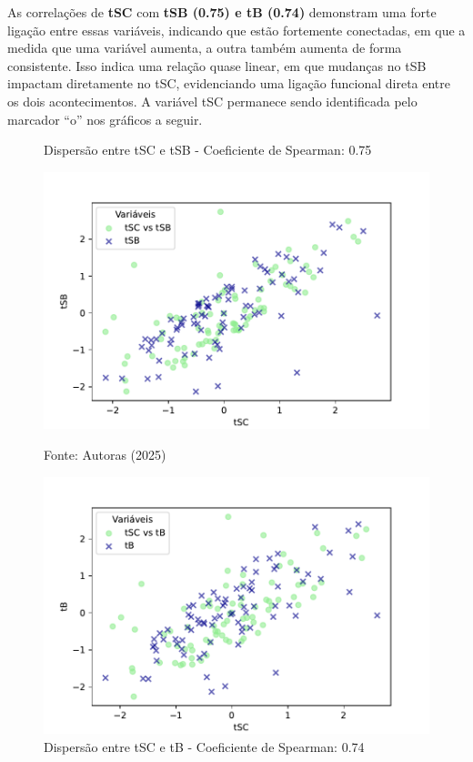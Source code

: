 As correlações de \textbf{tSC} com \textbf{tSB (0.75) e tB (0.74)} demonstram uma forte ligação entre essas variáveis, indicando que estão fortemente conectadas, em que a medida que uma variável aumenta, a outra também aumenta de forma consistente. Isso indica uma relação quase linear, em que mudanças no tSB impactam diretamente no tSC, evidenciando uma ligação funcional direta entre os dois acontecimentos. A variável tSC permanece sendo identificada pelo marcador “o” nos gráficos a seguir.

\begin{figure}[h]
    \captionsetup{font=footnotesize, justification=centering, labelsep=period, position=above}
    \centering
    \begin{minipage}[b]{0.45\linewidth}
        \caption{Dispersão entre tSC e tSB - Coeficiente de Spearman: 0.75}
        \label{fig:tSC-tSB}
        \centering
        \includegraphics[scale=0.35]{figuras/Spearman/tSC-tSB.pdf}
        \vspace{0.3cm}
        \begin{minipage}{\linewidth}
            \centering
            \scriptsize{Fonte: Autoras (2025)}
        \end{minipage}
    \end{minipage}
    \hspace{0.05\linewidth}
    \begin{minipage}[b]{0.45\linewidth}
        \caption{Dispersão entre tSC e tB - Coeficiente de Spearman: 0.74}
        \label{fig:tSC-tB}
        \centering
        \includegraphics[scale=0.35]{figuras/Spearman/tSC-tB.pdf}

\end{minipage}
\end{figure}
